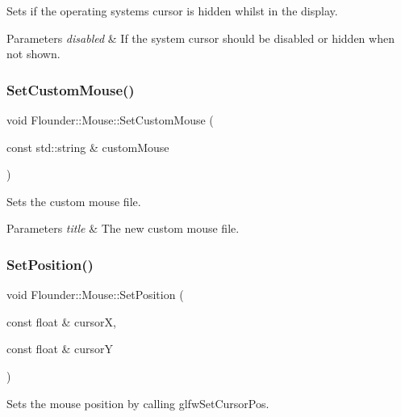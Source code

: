Sets if the operating systems cursor is hidden whilst in the display. 


\begin{DoxyParams}{Parameters}
{\em disabled} & If the system cursor should be disabled or hidden when not shown. \\
\hline
\end{DoxyParams}
\mbox{\label{class_flounder_1_1_mouse_a41ee0200977c94e336d39cc7c8d5220b}} 
\subsubsection{\texorpdfstring{Set\+Custom\+Mouse()}{SetCustomMouse()}}
{\footnotesize\ttfamily void Flounder\+::\+Mouse\+::\+Set\+Custom\+Mouse (\begin{DoxyParamCaption}\item[{const std\+::string \&}]{custom\+Mouse }\end{DoxyParamCaption})}



Sets the custom mouse file. 


\begin{DoxyParams}{Parameters}
{\em title} & The new custom mouse file. \\
\hline
\end{DoxyParams}
\mbox{\label{class_flounder_1_1_mouse_aefde9c7cd0c04fe03edf838855cb5df2}} 
\subsubsection{\texorpdfstring{Set\+Position()}{SetPosition()}}
{\footnotesize\ttfamily void Flounder\+::\+Mouse\+::\+Set\+Position (\begin{DoxyParamCaption}\item[{const float \&}]{cursorX,  }\item[{const float \&}]{cursorY }\end{DoxyParamCaption})}



Sets the mouse position by calling glfw\+Set\+Cursor\+Pos. 


